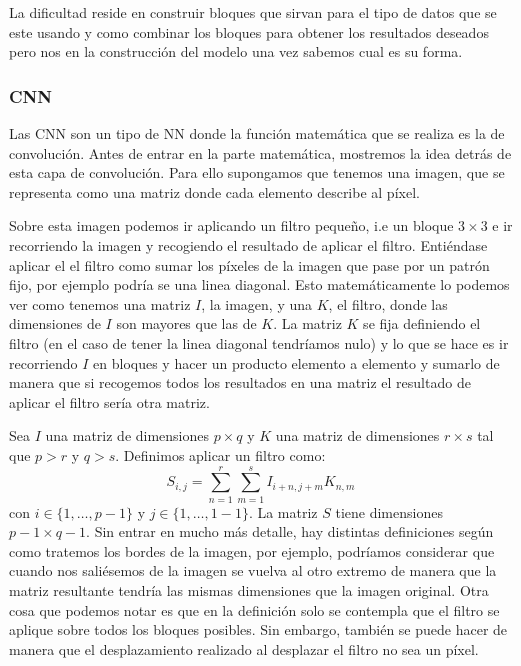 \documentclass[a4paper,12pt,twoside,titlepage]{article}
\begin{document}
La dificultad reside en construir bloques que sirvan para el tipo de datos que se este usando y como combinar los bloques para obtener los resultados deseados pero nos en la construcción del modelo una vez sabemos cual es su forma.

\subsubsection*{CNN}

Las CNN son un tipo de NN donde la función matemática que se realiza es la de convolución. Antes de entrar en la parte matemática, mostremos la idea detrás de esta capa de convolución. Para ello supongamos que tenemos una imagen, que se representa como una matriz donde cada elemento describe al píxel.

Sobre esta imagen podemos ir aplicando un filtro pequeño, i.e un bloque $3\times 3$ e ir recorriendo la imagen y recogiendo el resultado de aplicar el filtro. Entiéndase aplicar el el filtro como sumar los píxeles de la imagen que pase por un patrón fijo, por ejemplo podría se una linea diagonal. Esto matemáticamente lo podemos ver como tenemos una matriz $I$, la imagen, y una $K$, el filtro, donde las dimensiones de $I$ son mayores que las de $K$. La matriz $K$ se fija definiendo el filtro (en el caso de tener la linea diagonal tendríamos nulo) y lo que se hace es ir recorriendo $I$ en bloques y hacer un producto elemento a elemento y sumarlo de manera que si recogemos todos los resultados en una matriz el resultado de aplicar el filtro sería otra matriz.

Sea $I$ una matriz de dimensiones $p\times q$ y $K$ una matriz de dimensiones $r\times s$ tal que $p>r$ y $q>s$. Definimos aplicar un filtro como:
\begin{equation}
  \label{ec:def_filtro}
  S_{i, j} = \sum_{n=1}^{r}\sum_{m=1}^{s}I_{i + n, j + m}K_{n,m}
\end{equation}
con $i\in\{1,\dots, p -1 \}$ y $j\in\{1,\dots, 1 -1\}$. La matriz $S$ tiene dimensiones $p-1\times q-1$. Sin entrar en mucho más detalle, hay distintas definiciones según como tratemos los bordes de la imagen, por ejemplo, podríamos considerar que cuando nos saliésemos de la imagen se vuelva al otro extremo de manera que la matriz resultante tendría las mismas dimensiones que la imagen original. Otra cosa que podemos notar es que en la definición solo se contempla que el filtro se aplique sobre todos los bloques posibles. Sin embargo, también se puede hacer de manera que el desplazamiento realizado al desplazar el filtro no sea un píxel.
\end{document}
